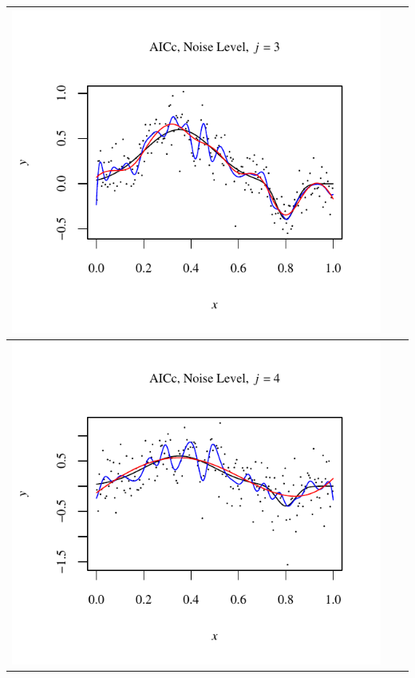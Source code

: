 \documentclass[11pt]{article}
\begin{document}
\begin{table}[h!]
\begin{center}
\begin{tabular}{| >{\centering\arraybackslash}m{2.1in} |  >{\centering\arraybackslash}m{2.1in} |  >{\centering\arraybackslash}m{2.1in}|}
      \includegraphics[width=1\linewidth,height=0.18\textheight]{Graphs/3/1/assignment5_a_3_1_3}\\\hline
      \includegraphics[width=1\linewidth,height=0.18\textheight]{Graphs/3/1/assignment5_a_3_1_4}&

\end{tabular}
\end{center}
\end{table}
\end{document}
